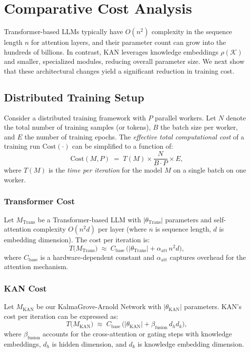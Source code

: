 \documentclass[11pt]{article}
\begin{document}
\section{Comparative Cost Analysis}
Transformer-based LLMs typically have $O(n^2)$ complexity in the sequence length $n$ for attention layers, and their parameter count can grow into the hundreds of billions. In contrast, KAN leverages knowledge embeddings $\rho(\mathcal{K})$ and smaller, specialized modules, reducing overall parameter size. We next show that these architectural changes yield a significant reduction in training cost.

\subsection{Distributed Training Setup}
Consider a distributed training framework with $P$ parallel workers. Let $N$ denote the total number of training samples (or tokens), $B$ the batch size per worker, and $E$ the number of training epochs. The \emph{effective total computational cost} of a training run $\mathrm{Cost}(\cdot)$ can be simplified to a function of:
\[
    \mathrm{Cost}(M, P) \;=\; T(M) \times \frac{N}{B \cdot P} \times E,
\]
where $T(M)$ is the \emph{time per iteration} for the model $M$ on a single batch on one worker.

\subsubsection{Transformer Cost}
Let $M_{\mathrm{Trans}}$ be a Transformer-based LLM with $|\theta_{\mathrm{Trans}}|$ parameters and self-attention complexity $O(n^2 d)$ per layer (where $n$ is sequence length, $d$ is embedding dimension). The cost per iteration is:
\begin{equation}
    \label{eq:transformer_cost}
    T\big(M_{\mathrm{Trans}}\big) \;\approx\; C_{\mathrm{base}} \,\bigl(|\theta_{\mathrm{Trans}}| + \alpha_{\mathrm{att}}\,n^2 d \bigr),
\end{equation}
where $C_{\mathrm{base}}$ is a hardware-dependent constant and $\alpha_{\mathrm{att}}$ captures overhead for the attention mechanism.

\subsubsection{KAN Cost}
Let $M_{\mathrm{KAN}}$ be our KalmaGrove-Arnold Network with $|\theta_{\mathrm{KAN}}|$ parameters. KAN’s cost per iteration can be expressed as:
\begin{equation}
    \label{eq:kan_cost}
    T\big(M_{\mathrm{KAN}}\big) \;\approx\; C_{\mathrm{base}} \,\bigl(|\theta_{\mathrm{KAN}}| + \beta_{\mathrm{fusion}}\,d_h d_k \bigr),
\end{equation}
where $\beta_{\mathrm{fusion}}$ accounts for the cross-attention or gating steps with knowledge embeddings, $d_h$ is hidden dimension, and $d_k$ is knowledge embedding dimension.
\end{document}

